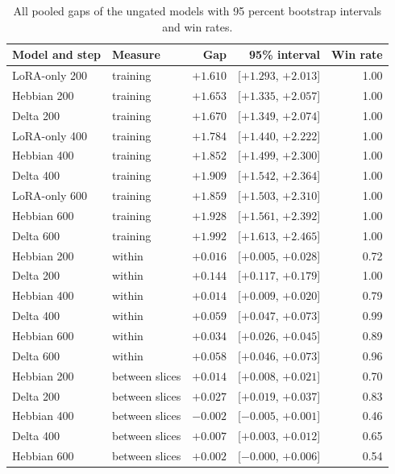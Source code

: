 \documentclass[12pt,a4paper]{report}
\begin{document}
\begin{table}[H]
  \centering
  \caption{All pooled gaps of the ungated models with 95 percent bootstrap intervals and win rates.}
  \label{tab-full}
  \scriptsize
  \begin{tabular}{llrrr}
    \toprule
    Model and step & Measure & Gap & 95\% interval & Win rate \\
    \midrule
    LoRA-only 200 & training & $+1.610$ & [$+1.293$, $+2.013$] & 1.00 \\
    Hebbian 200 & training & $+1.653$ & [$+1.335$, $+2.057$] & 1.00 \\
    Delta 200 & training & $+1.670$ & [$+1.349$, $+2.074$] & 1.00 \\
    LoRA-only 400 & training & $+1.784$ & [$+1.440$, $+2.222$] & 1.00 \\
    Hebbian 400 & training & $+1.852$ & [$+1.499$, $+2.300$] & 1.00 \\
    Delta 400 & training & $+1.909$ & [$+1.542$, $+2.364$] & 1.00 \\
    LoRA-only 600 & training & $+1.859$ & [$+1.503$, $+2.310$] & 1.00 \\
    Hebbian 600 & training & $+1.928$ & [$+1.561$, $+2.392$] & 1.00 \\
    Delta 600 & training & $+1.992$ & [$+1.613$, $+2.465$] & 1.00 \\
    \midrule
    Hebbian 200 & within & $+0.016$ & [$+0.005$, $+0.028$] & 0.72 \\
    Delta 200 & within & $+0.144$ & [$+0.117$, $+0.179$] & 1.00 \\
    Hebbian 400 & within & $+0.014$ & [$+0.009$, $+0.020$] & 0.79 \\
    Delta 400 & within & $+0.059$ & [$+0.047$, $+0.073$] & 0.99 \\
    Hebbian 600 & within & $+0.034$ & [$+0.026$, $+0.045$] & 0.89 \\
    Delta 600 & within & $+0.058$ & [$+0.046$, $+0.073$] & 0.96 \\
    \midrule
    Hebbian 200 & between slices & $+0.014$ & [$+0.008$, $+0.021$] & 0.70 \\
    Delta 200 & between slices & $+0.027$ & [$+0.019$, $+0.037$] & 0.83 \\
    Hebbian 400 & between slices & $-0.002$ & [$-0.005$, $+0.001$] & 0.46 \\
    Delta 400 & between slices & $+0.007$ & [$+0.003$, $+0.012$] & 0.65 \\
    Hebbian 600 & between slices & $+0.002$ & [$-0.000$, $+0.006$] & 0.54 \\

\end{tabular}
\end{table}
\end{document}

